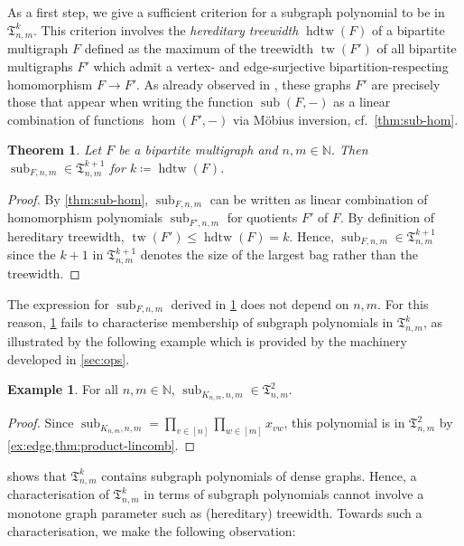 \documentclass[10pt,a4paper]{article}
\theoremstyle{definition}
\newtheorem{example}[definition]{Example}
\theoremstyle{plain}
\newtheorem{theorem}[definition]{Theorem}
\theoremstyle{remark}
\DeclareMathOperator{\tw}{tw}
\DeclareMathOperator{\hdtw}{hdtw}
\DeclareMathOperator{\sub}{sub}
\begin{document}
	As a first step, we give a sufficient criterion for a subgraph polynomial to be in $\mathfrak{T}^k_{n,m}$.
	This criterion involves the \emph{hereditary treewidth} $\hdtw(F)$ of a bipartite multigraph $F$ defined as the maximum of the treewidth $\tw(F')$ of all bipartite multigraphs $F'$ which admit a vertex- and edge-surjective bipartition-respecting homomorphism $F \to F'$.
	As already observed in \cite{curticapean_homomorphisms_2017}, these graphs $F'$ are precisely those that appear when writing the function $\sub(F, -)$ as a linear combination of functions $\hom(F', -)$ via Möbius inversion, cf.\ \cref{thm:sub-hom}.
	
	\begin{theorem}\label{thm:sub-hom-poly}
		Let $F$ be a bipartite multigraph and $n,m \in \mathbb{N}$.
		Then $\sub_{F, n,m} \in \mathfrak{T}^{k+1}_{n,m}$ for $k \coloneqq \hdtw(F)$.
	\end{theorem}
	\begin{proof}
		By \cref{thm:sub-hom}, $\sub_{F, n,m}$ can be written as linear combination of homomorphism polynomials $\sub_{F', n,m}$ for quotients $F'$ of $F$.
		By definition of hereditary treewidth, $\tw(F') \leq \hdtw(F) = k$.
		Hence, $\sub_{F, n,m} \in \mathfrak{T}^{k+1}_{n,m}$ since the $k+1$ in $ \mathfrak{T}^{k+1}_{n,m}$ denotes the size of the largest bag rather than the treewidth.
	\end{proof}

	The expression for $\sub_{F, n,m}$ derived in \cref{thm:sub-hom-poly} does not depend on $n,m$.
	For this reason, \cref{thm:sub-hom-poly} fails to characterise membership of subgraph polynomials in $\mathfrak{T}^k_{n,m}$,
	as illustrated by the following example which is provided by the machinery developed in \cref{sec:ops}.
	\begin{example} \label{ex:knm}
		For all $n,m \in \mathbb{N}$,
		$\sub_{K_{n,m}, n,m} \in \mathfrak{T}^2_{n,m}$.
	\end{example}
	\begin{proof}
		Since $\sub_{K_{n,m}, n,m} = \prod_{v\in [n]}
                \prod_{w \in [m]} x_{vw}$, this polynomial is in $\mathfrak{T}^2_{n,m}$ by \cref{ex:edge,thm:product-lincomb}.
	\end{proof}
	
	 shows that $\mathfrak{T}^k_{n,m}$ contains subgraph polynomials of dense graphs.
	Hence, a characterisation of $\mathfrak{T}^k_{n,m}$ in terms of subgraph polynomials cannot involve a monotone graph parameter such as (hereditary) treewidth.
	Towards such a characterisation, we make the following observation:
	
\end{document}
